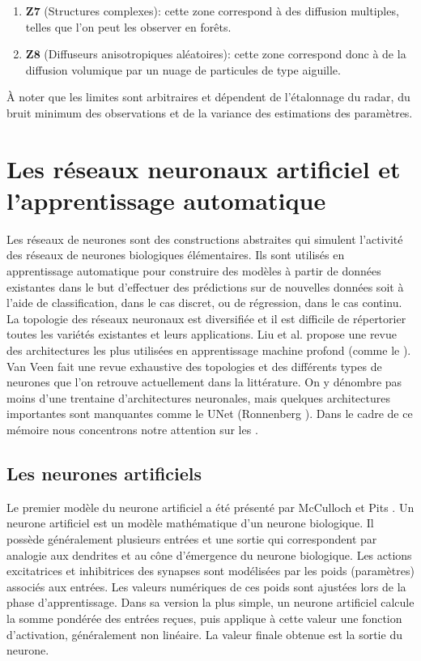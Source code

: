\begin{enumerate}
\begin{enumerate}
     \item  $\boldsymbol{Z7}$  (Structures complexes):   cette zone correspond à des diffusion multiples, telles que l’on peut les observer en forêts.
      \item  $\boldsymbol{Z8}$ (Diffuseurs anisotropiques aléatoires): cette zone correspond donc à de la diffusion volumique par un nuage de
particules de type aiguille.

      \end{enumerate}
    
\end{enumerate}


À noter que les limites sont arbitraires et dépendent de l'étalonnage du radar, du bruit minimum des observations et de la variance des estimations des paramètres.

\newpage
\section{Les réseaux neuronaux artificiel et l'apprentissage automatique}
Les réseaux de neurones sont des constructions abstraites qui simulent l’activité des réseaux de neurones biologiques élémentaires. Ils sont utilisés en apprentissage automatique pour construire des modèles à partir de données existantes dans le but d’effectuer des prédictions sur de nouvelles données soit à l’aide de classification, dans le cas discret, ou  de régression, dans le cas continu. 
La topologie des réseaux neuronaux est diversifiée et il est difficile de répertorier toutes les variétés existantes et leurs applications.  Liu et al. \cite{Liu2017ASO} propose une revue des architectures les plus utilisées en apprentissage machine profond (comme le \acrconvnetns). Van Veen \cite{VanVeen2016} fait une revue exhaustive des topologies et des différents types de neurones que l’on retrouve actuellement dans la littérature.  On y dénombre pas moins d'une trentaine d'architectures neuronales, mais quelques architectures importantes sont manquantes comme le UNet (Ronnenberg \cite{Ronneberger2015UNetCN}).  Dans le cadre de ce mémoire nous concentrons notre attention sur les \acrconvnetns.

\subsection{Les neurones artificiels}

Le premier modèle du neurone artificiel a été présenté par McCulloch et Pits \cite{McCulloch1943}. Un neurone artificiel est un modèle mathématique d'un neurone biologique.  Il possède généralement plusieurs entrées et une sortie qui correspondent par analogie aux dendrites et au cône d'émergence du neurone biologique. Les actions excitatrices et inhibitrices des synapses sont modélisées par les poids (paramètres) associés aux entrées. Les valeurs numériques de ces poids sont ajustées lors de la  phase d'apprentissage. Dans sa version la plus simple, un neurone artificiel calcule la somme pondérée des entrées reçues, puis applique à cette valeur une fonction d'activation, généralement non linéaire. La valeur finale obtenue est la sortie du neurone. 


